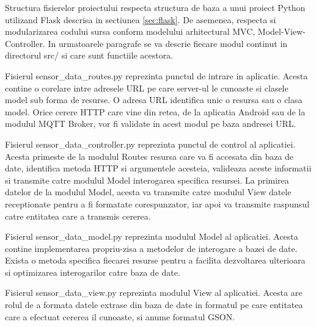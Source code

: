 Structura fisierelor proiectului respecta structura de baza a unui proiect Python utilizand Flask descrisa in sectiunea \ref{sec:flask}. De asemenea, respecta si 
modularizarea codului sursa conform modelului arhitectural MVC, Model-View-Controller. In urmatoarele paragrafe se va descrie fiecare modul continut in directorul 
src/ si care sunt functiile acestora.

Fisierul sensor\_data\_routes.py reprezinta punctul de intrare in aplicatie. Acesta contine o corelare intre adresele URL pe care server-ul le cunoaste si clasele model 
sub forma de resurse. O adresa URL identifica unic o resursa sau o clasa model. Orice cerere HTTP care vine din retea, de la aplicatia Android sau de la modulul MQTT Broker, 
vor fi validate in acest modul pe baza andresei URL.

Fisierul sensor\_data\_controller.py reprezinta punctul de control al aplicatiei. Acesta primeste de la modulul Routes resursa care va fi accesata din baza de date, 
identifica metoda HTTP si argumentele acesteia, valideaza aceste informatii si transmite catre modulul Model interogarea specifica resursei. La primirea datelor de la 
modulul Model, acesta va transmite catre modulul View datele receptionate pentru a fi formatate corespunzator, iar apoi va transmite raspunsul catre entitatea care a transmis 
cererea.

Fisierul sensor\_data\_model.py reprezinta modulul Model al aplicatiei. Acesta contine implementarea propriu-zisa a metodelor de interogare a bazei de date. Exista o metoda 
specifica fiecarei resurse pentru a facilita dezvoltarea ulterioara si optimizarea interogarilor catre baza de date.

Fisierul sensor\_data\_view.py reprezinta modulul View al aplicatiei. Acesta are rolul de a formata datele extrase din baza de date in formatul pe care entitatea care a 
efectuat cererea il cunoaste, si anume formatul GSON. 

